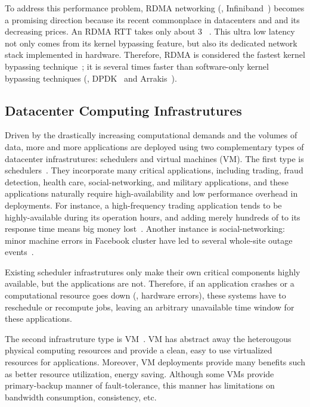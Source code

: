 To address this \paxos performance problem, RDMA networking (\eg, 
Infiniband~\cite{infiniband}) becomes a promising direction because its recent 
commonplace in datacenters and and its decreasing prices. An RDMA RTT takes 
only about 3 \us~\cite{pilaf:usenix14}. This ultra low latency not only comes 
from its kernel bypassing feature, but also its dedicated network stack 
implemented in hardware. Therefore, RDMA is considered the fastest kernel 
bypassing technique~\cite{herd:sigcomm14,pilaf:usenix14,dare:hpdc15}; it is 
several times faster than software-only kernel bypassing techniques (\eg, 
DPDK~\cite{dpdk} and Arrakis~\cite{arrakis:osdi14}).

\vspace{-.15in}\subsection{Datacenter Computing Infrastrutures}
\label{sec:datacenter}\vspace{-.075in}



Driven by the drastically increasing computational demands and the volumes of 
data, more and more applications are deployed using two complementary types of 
datacenter infrastrutures: 
schedulers and virtual machines 
(VM). The first type is 
schedulers~\cite{borg:eurosys15,mesos:nsdi11,tupperware, yarn:socc13,
autopilot:sosp07,quincy:sosp09,apollo:osdi14,fuxi:vldb14}. They incorporate 
many critical applications, including trading, 
fraud detection, health care, social-networking, and military applications, and 
these applications naturally require high-availability 
and low performance overhead in deployments. For instance, a high-frequency 
trading application tends to be highly-available during its operation hours, 
and adding merely hundreds of \us to its response time means big money 
lost~\cite{nosql:finance}. Another instance is social-networking: minor machine 
errors in Facebook cluster have led to several whole-site outage 
events~\cite{facebook:outage}.


Existing scheduler infrastrutures only make their own critical components 
highly available, but the applications are not. Therefore, if an application 
crashes or a computational resource goes down (\eg, hardware errors), these 
systems have to reschedule or recompute jobs, leaving an arbitrary unavailable 
time window for these applications.

% 
The second infrastruture type is VM~\cite{amazon:ec2, openstack, vmware}. VM 
has abstract away the heterougous physical computing resources and provide a 
clean, easy to use virtualized resources for applications. Moreover, VM 
deployments provide many benefits such as better resource utilization, energy 
saving. Although some VMs provide primary-backup manner of fault-tolerance, 
this manner has limitations on bandwidth consumption, consistency, etc.

